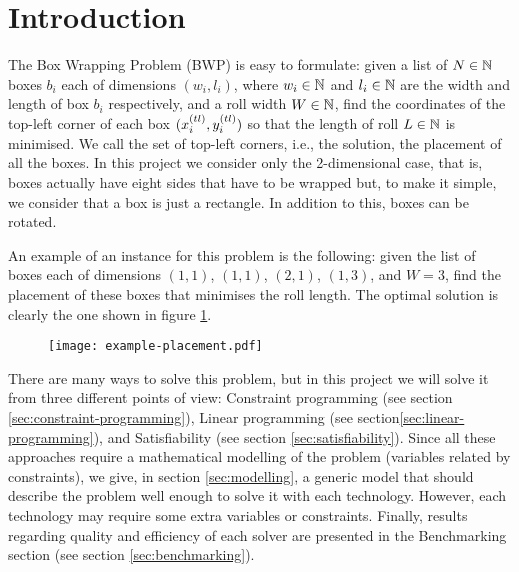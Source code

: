 \section{Introduction}
\label{sec:introduction}

The Box Wrapping Problem (BWP) is easy to formulate: given a list of $N \in \mathbb{N}$ boxes
$b_i$ each of dimensions $(w_i, l_i)$, where $w_i \in \mathbb{N}$ and $l_i \in \mathbb{N}$
are the width and length of box $b_i$ respectively, and a roll width $W \in \mathbb{N}$,
find the coordinates of  the top-left corner of each box $(\Xtl[i], \Ytl[i])$ so that
the length of roll $L \in \mathbb{N}$ is minimised. We call the set of top-left corners, i.e.,
the solution, the placement of all the boxes. In this project we consider only the
2-dimensional case, that is, boxes actually have eight sides that have to be wrapped but,
to make it simple, we consider that a box is just a rectangle. In addition to this, boxes
can be rotated.

\hfill

An example of an instance for this problem is the following: given the list of boxes each
of dimensions $(1,1)$, $(1,1)$, $(2,1)$, $(1,3)$, and $W=3$, find the placement of these
boxes that minimises the roll length. The optimal solution is clearly the one shown
in figure \ref{fig:example-placement}.

\begin{figure}[H]
	\centering
    \texttt{[image: example-placement.pdf]}
	\label{fig:example-placement}
\end{figure}

There are many ways to solve this problem, but in this project we will solve it from
three different points of view: Constraint programming (see section \ref{sec:constraint-programming}),
Linear programming (see section\ref{sec:linear-programming}), and Satisfiability (see
section \ref{sec:satisfiability}). Since all these approaches require a mathematical modelling
of the problem (variables related by constraints), we give, in section \ref{sec:modelling},
a generic model that should describe the problem well enough to solve it with each technology.
However, each technology may require some extra variables or constraints. Finally, results
regarding quality and efficiency of each solver are presented in the Benchmarking
section (see section \ref{sec:benchmarking}).